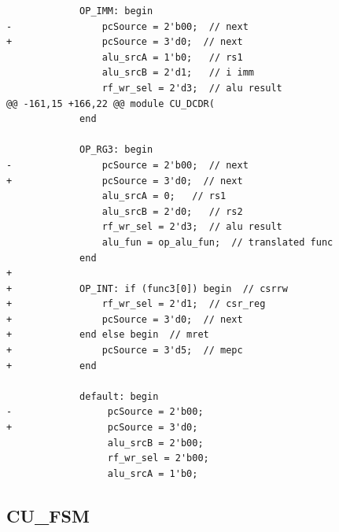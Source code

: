 \documentclass{article}
\begin{document}
\begin{verbatim}
             OP_IMM: begin
-                pcSource = 2'b00;  // next
+                pcSource = 3'd0;  // next
                 alu_srcA = 1'b0;   // rs1
                 alu_srcB = 2'd1;   // i imm
                 rf_wr_sel = 2'd3;  // alu result
@@ -161,15 +166,22 @@ module CU_DCDR(
             end
             
             OP_RG3: begin
-                pcSource = 2'b00;  // next
+                pcSource = 3'd0;  // next
                 alu_srcA = 0;   // rs1
                 alu_srcB = 2'd0;   // rs2
                 rf_wr_sel = 2'd3;  // alu result
                 alu_fun = op_alu_fun;  // translated func             
             end
+            
+            OP_INT: if (func3[0]) begin  // csrrw
+                rf_wr_sel = 2'd1;  // csr_reg
+                pcSource = 3'd0;  // next
+            end else begin  // mret
+                pcSource = 3'd5;  // mepc
+            end
 
             default: begin
-                 pcSource = 2'b00; 
+                 pcSource = 3'd0; 
                  alu_srcB = 2'b00; 
                  rf_wr_sel = 2'b00; 
                  alu_srcA = 1'b0; 
\end{verbatim}

\pagebreak

\subsection{CU\_FSM}
\end{document}
